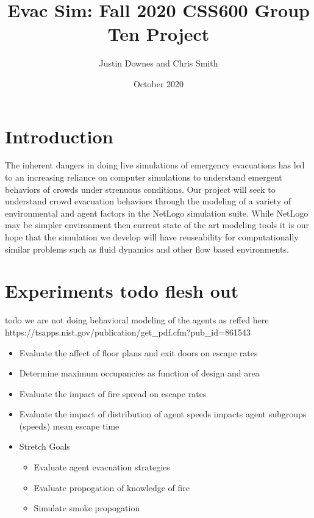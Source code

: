 \documentclass[12pt,letterpaper]{article}
\begin{document}
\title{\vspace{-3cm}Evac Sim: Fall 2020 CSS600 Group Ten Project}
\author{Justin Downes and Chris Smith}
\date{October 2020}
\maketitle

\section {Introduction}

The inherent dangers in doing live simulations of emergency evacuations has led to an increasing reliance on computer simulations to understand emergent behaviors of crowds under strenuous conditions\cite{almeidaCrowdSimulationModeling2013}.  Our project will seek to understand crowd evacuation behaviors through the modeling of a variety of environmental and agent factors in the NetLogo simulation suite. While NetLogo may be simpler environment then current state of the art modeling tools it is our hope that the simulation we develop will have reuseability for computationally similar problems such as fluid dynamics and other flow based environments.

\section {Experiments todo flesh out}
todo we are not doing behavioral modeling of the agents as reffed here  https://tsapps.nist.gov/publication/get\_pdf.cfm?pub\_id=861543

\begin{itemize}
\item Evaluate the affect of floor plans and exit doors on escape rates
\item Determine maximum occupancies as function of design and area
\item Evaluate the impact of fire spread on escape rates
\item Evaluate the impact of distribution of agent speeds impacts agent subgroups (speeds) mean escape time
\item Stretch Goals
\begin{itemize}
\item Evaluate agent evacuation strategies
\item Evaluate propogation of knowledge of fire
\item Simulate smoke propogation
\end{itemize}
\end{itemize}
\end{document}
